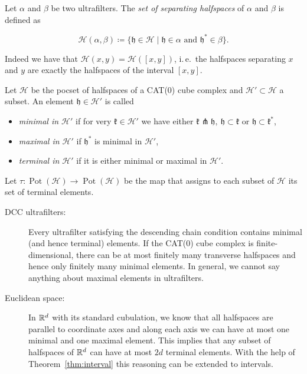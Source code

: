 \begin{defin}
  \label{defin:separating}
  Let \(\alpha\) and \(\beta\) be two ultrafilters. The \emph{set of separating halfspaces} of \(\alpha\) and \(\beta\) is defined as

  \[
    \mathcal{H}(\alpha,\beta) \coloneqq \{\mathfrak{h} \in \mathcal{H} \mid \mathfrak{h} \in \alpha \text{ and } \mathfrak{h}^\ast \in \beta\}.
  \]
\end{defin}

\begin{rem}
  \label{rem:interval}
  Indeed we have that \(\mathcal{H}(x,y) = \mathcal{H}([x,y])\), i.\,e.\ the halfspaces separating \(x\) and \(y\) are exactly the halfspaces of the interval \([x,y]\).
\end{rem}

\begin{defin}
  \label{defin:tau}
  Let \(\mathcal{H}\) be the pocset of halfspaces of a CAT(0) cube complex and \(\mathcal{H}' \subset \mathcal{H}\) a subset. An element \(\mathfrak{h} \in \mathcal{H}'\) is called
  \begin{itemize}
  \item \emph{minimal in \(\mathcal{H}'\)} if for very \(\mathfrak{k} \in \mathcal{H'}\) we have either \(\mathfrak{k} \pitchfork \mathfrak{h},\ \mathfrak{h} \subset \mathfrak{k}\) or \(\mathfrak{h} \subset \mathfrak{k}^\ast\),
  \item \emph{maximal in \(\mathcal{H}'\)} if \(\mathfrak{h}^\ast\) is minimal in \(\mathcal{H}'\),
  \item \emph{terminal in \(\mathcal{H}'\)} if it is either minimal or maximal in \(\mathcal{H}'\).
  \end{itemize}
  Let \(\tau\colon \operatorname{Pot}(\mathcal{H}) \to \operatorname{Pot}(\mathcal{H})\) be the map that assigns to each subset of \(\mathcal{H}\) its set of terminal elements.
\end{defin}

\begin{bsp}
  \label{bsp:finite-terminal}
  \begin{description}
  \item[DCC ultrafilters:] Every ultrafilter satisfying the descending chain condition contains minimal (and hence terminal) elements. If the CAT(0) cube complex is finite-dimensional, there can be at most finitely many transverse halfspaces and hence only finitely many minimal elements. In general, we cannot say anything about maximal elements in ultrafilters. 
  \item[Euclidean space:] In \(\mathbb{R}^d\) with its standard cubulation, we know that all halfspaces are parallel to coordinate axes and along each axis we can have at most one minimal and one maximal element. This implies that any subset of halfspaces of \(\mathbb{R}^d\) can have at most \(2d\) terminal elements. With the help of Theorem~\ref{thm:interval} this reasoning can be extended to intervals.
  \end{description}
\end{bsp}

